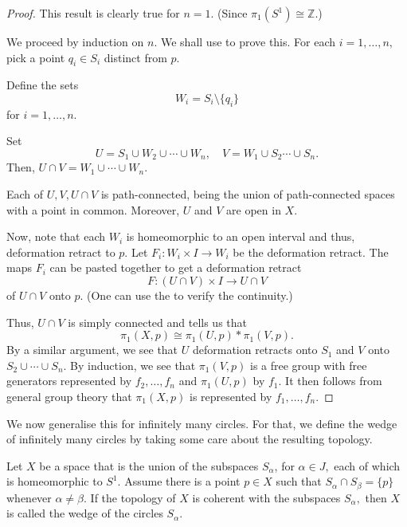 \documentclass[12pt]{article}
\begin{document}
\begin{proof} 
	This result is clearly true for $n = 1.$ (Since $\pi_1(S^1)\cong\mathbb{Z}.$)

	We proceed by induction on $n.$ We shall use  to prove this. For each $i = 1, \ldots, n,$ pick a point $q_i \in S_i$ distinct from $p.$ 

	Define the sets
	\begin{equation*} 
		W_i = S_i \setminus \{q_i\}
	\end{equation*}
	for $i = 1, \ldots, n.$

	Set
	\begin{equation*} 
		U = S_1 \cup W_2 \cup \cdots \cup W_n, \quad V = W_1 \cup S_2 \cdots \cup S_n.
	\end{equation*}
	Then, $U \cap V = W_1 \cup \cdots \cup W_n.$

	Each of $U, V, U \cap V$ is path-connected, being the union of path-connected spaces with a point in common. Moreover, $U$ and $V$ are open in $X.$

	Now, note that each $W_i$ is homeomorphic to an open interval and thus, deformation retract to $p.$ Let $F_i:W_i\times I \to W_i$ be the deformation retract. The maps $F_i$ can be pasted together to get a deformation retract
	\begin{equation*} 
		F:(U \cap V)\times I \to U\cap V
	\end{equation*}
	of $U \cap V$ onto $p.$ (One can use the  to verify the continuity.)

	Thus, $U \cap V$ is simply connected and  tells us that
	\begin{equation*} 
		\pi_1(X, p) \cong \pi_1(U, p) * \pi_1(V, p).
	\end{equation*}
	By a similar argument, we see that $U$ deformation retracts onto $S_1$ and $V$ onto $S_2 \cup \cdots \cup S_n.$ By induction, we see that $\pi_1(V, p)$ is a free group with free generators represented by $f_2, \ldots, f_n$ and $\pi_1(U, p)$ by $f_1.$ It then follows from general group theory that $\pi_1(X, p)$ is represented by $f_1, \ldots, f_n.$
\end{proof}

We now generalise this for infinitely many circles. For that, we define the wedge of infinitely many circles by taking some care about the resulting topology.

\begin{defn}
	Let $X$ be a space that is the union of the subspaces $S_\alpha$, for $\alpha\in J,$ each of which is homeomorphic to $S^1.$ Assume there is a point $p \in X$ such that $S_\alpha\cap S_\beta = \{p\}$ whenever $\alpha \neq \beta.$ If the topology of $X$ is coherent with the subspaces $S_\alpha,$ then $X$ is called the wedge of the circles $S_\alpha.$
\end{defn}
\end{document}
